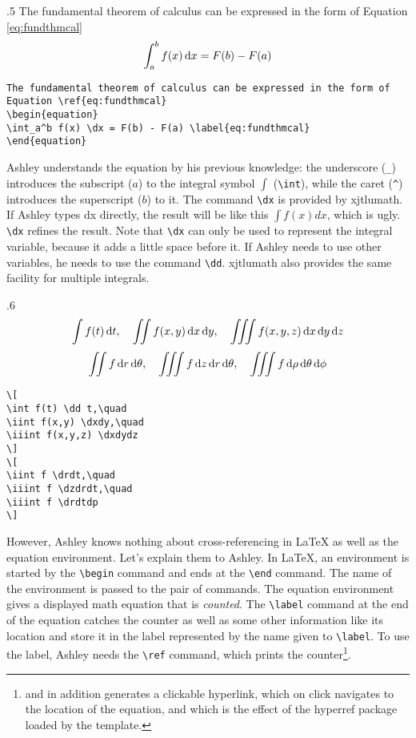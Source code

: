 \begin{miniexammar}{.5\textandmarginlen}%
{
The fundamental theorem of calculus can be expressed in the form of Equation \ref{eq:fundthmcal}
\begin{equation}
\int_a^b f(x) \,\mathrm{d} x = F(b) - F(a) \label{eq:fundthmcal}
\end{equation}
}
\begin{lstlisting}
The fundamental theorem of calculus can be expressed in the form of Equation \ref{eq:fundthmcal}
\begin{equation}
\int_a^b f(x) \dx = F(b) - F(a) \label{eq:fundthmcal}
\end{equation}
\end{lstlisting}
\end{miniexammar}

Ashley understands the equation by his previous knowledge: the underscore (\verb=_=) introduces the subscript ($a$) to the integral symbol $\int$ (\verb=\int=), while the caret (\verb=^=) introduces the superscript ($b$) to it. The command \verb=\dx= is provided by xjtlumath. If Ashley types dx directly, the result will be like this $\int f(x) dx$, which is ugly. \verb=\dx= refines the result. Note that \verb=\dx= can only be used to represent the integral variable, because it adds a little space before it. If Ashley needs to use other variables, he needs to use the command \verb=\dd=. xjtlumath also provides the same facility for multiple integrals.

\begin{miniexammar}{.6\textandmarginlen}%
{
\[
\int f(t) \,\mathrm{d} t,\quad
\iint f(x,y) \,\mathrm{d} x \,\mathrm{d} y,\quad
\iiint f(x,y,z) \,\mathrm{d} x \,\mathrm{d} y \,\mathrm{d} z
\]
\[
\iint f \,\mathrm{d} r \,\mathrm{d} \theta,\quad
\iiint f \,\mathrm{d} z \,\mathrm{d} r \,\mathrm{d} \theta,\quad
\iiint f \,\mathrm{d} \rho \,\mathrm{d} \theta \,\mathrm{d} \phi
\]
}
\begin{lstlisting}
\[
\int f(t) \dd t,\quad
\iint f(x,y) \dxdy,\quad
\iiint f(x,y,z) \dxdydz
\]
\[
\iint f \drdt,\quad
\iiint f \dzdrdt,\quad
\iiint f \drdtdp
\]
\end{lstlisting}
\end{miniexammar}

However, Ashley knows nothing about cross-referencing in \LaTeX{} as well as the equation environment. Let's explain them to Ashley. In \LaTeX{}, an environment is started by the \verb=\begin= command and ends at the \verb=\end= command. The name of the environment is passed to the pair of commands. The equation environment gives a displayed math equation that is \emph{counted}. The \verb=\label= command at the end of the equation catches the counter as well as some other information like its location and store it in the label represented by the name given to \verb=\label=. To use the label, Ashley needs the \verb=\ref= command, which prints the counter\footnote{and in addition generates a clickable hyperlink, which on click navigates to the location of the equation, and which is the effect of the hyperref package loaded by the template.}.

